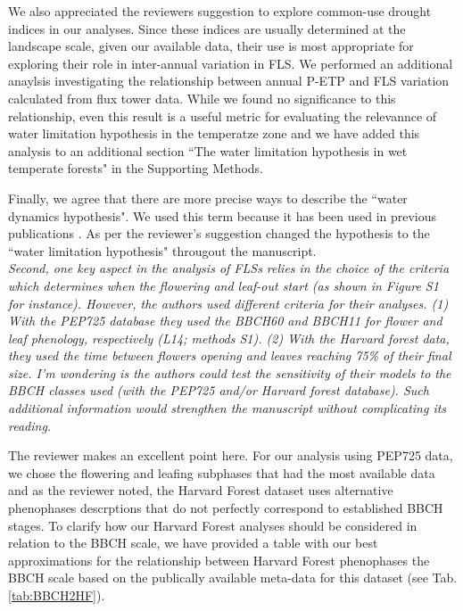 \documentclass{article}[11pt]
\begin{document}
\noindent We also appreciated the reviewers suggestion to explore common-use drought indices in our analyses. Since these indices are usually determined at the landscape scale, given our available data, their use is most appropriate for exploring their role in inter-annual variation in FLS. We performed an additional anaylsis investigating the relationship between annual P-ETP and FLS variation calculated from flux tower data. While we found no significance to this relationship, even this result is a useful metric for evaluating the relevannce of water limitation hypothesis in the temperatze zone  and we have added this analysis to an additional section ``The water limitation hypothesis in wet temperate forests" in the Supporting Methods.

\noindent Finally, we agree that there are more precise ways to describe the ``water dynamics hypothesis". We used this term because it has been used in previous publications \citep{Gougherty2018}. As per the reviewer's suggestion changed the hypothesis to the ``water limitation hypothesis" througout the manuscript.\\

\emph{Second, one key aspect in the analysis of FLSs relies in the choice of the criteria which determines when the flowering and leaf-out start (as shown in Figure S1 for instance). However, the authors used different criteria for their analyses. (1) With the PEP725 database they used the BBCH60 and BBCH11 for flower and leaf phenology, respectively (L14; methods S1). (2) With the Harvard forest data, they used the time between flowers opening and leaves reaching 75\% of their final size. I'm wondering is the authors could test the sensitivity of their models to the BBCH classes used (with the PEP725 and/or Harvard forest database). Such additional information would strengthen the manuscript without complicating its reading.}

\noindent The reviewer makes an excellent point here. For our analysis using PEP725 data, we chose the flowering and leafing subphases that had the most available data and as the reviewer noted, the Harvard Forest dataset uses alternative phenophases descrptions that do not perfectly correspond to established BBCH stages. To clarify how our Harvard Forest analyses should be considered in relation to the BBCH scale, we have provided a table with our best approximations for the relationship between Harvard Forest phenophases the BBCH scale based on the publically available meta-data for this dataset (see Tab. \ref{tab:BBCH2HF}).\\
\end{document}
